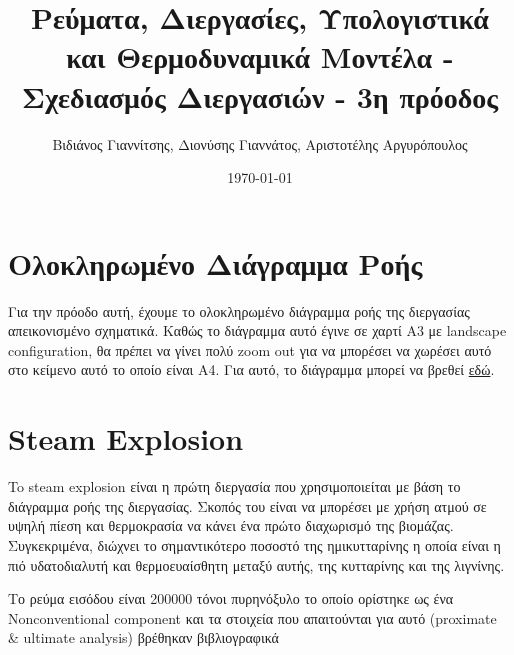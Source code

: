 \documentclass[11pt]{article}
\author{Βιδιάνος Γιαννίτσης, Διονύσης Γιαννάτος, Αριστοτέλης Αργυρόπουλος}
\date{\today}
\title{Ρεύματα, Διεργασίες, Υπολογιστικά και Θερμοδυναμικά Μοντέλα - Σχεδιασμός Διεργασιών - 3η πρόοδος}
\begin{document}
\maketitle
\tableofcontents

\renewcommand{\abstractname}{Περίληψη}
\renewcommand{\tablename}{Πίνακας}
\renewcommand{\figurename}{Σχήμα}
\renewcommand\listingscaption{Κώδικας}

\pagebreak

\section{Ολοκληρωμένο Διάγραμμα Ροής}
\label{sec:org67913a3}
Για την πρόοδο αυτή, έχουμε το ολοκληρωμένο διάγραμμα ροής της διεργασίας απεικονισμένο σχηματικά. Καθώς το διάγραμμα αυτό έγινε σε χαρτί Α3 με landscape configuration, θα πρέπει να γίνει πολύ zoom out για να μπορέσει να χωρέσει αυτό στο κείμενο αυτό το οποίο είναι Α4. Για αυτό, το διάγραμμα μπορεί να βρεθεί \href{https://github.com/Vidianos-Giannitsis/Process-Design/blob/master/Diagrams/complete\_flowsheet.pdf}{εδώ}. 

\section{Steam Explosion}
\label{sec:org90d2719}
To steam explosion είναι η πρώτη διεργασία που χρησιμοποιείται με βάση το διάγραμμα ροής της διεργασίας. Σκοπός του είναι να μπορέσει με χρήση ατμού σε υψηλή πίεση και θερμοκρασία να κάνει ένα πρώτο διαχωρισμό της βιομάζας. Συγκεκριμένα, διώχνει το σημαντικότερο ποσοστό της ημικυτταρίνης η οποία είναι η πιό υδατοδιαλυτή και θερμοευαίσθητη μεταξύ αυτής, της κυτταρίνης και της λιγνίνης.

Το ρεύμα εισόδου είναι 200000 τόνοι πυρηνόξυλο το οποίο ορίστηκε ως ένα Nonconventional component και τα στοιχεία που απαιτούνται για αυτό (proximate \& ultimate analysis) βρέθηκαν βιβλιογραφικά \cite{koutsomitopoulouPreparationCharacterizationOlive2014,gonzalezCombustionOptimisationBiomass2004} 
\end{document}
